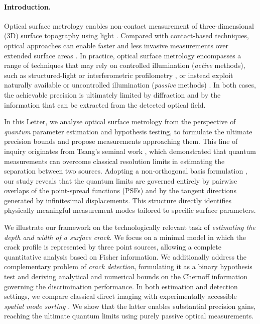 \documentclass[reprint,amsmath,amssymb,aps,prl,floatfix,groupedaddress,superscriptaddress]{revtex4-2}
\begin{document}
\maketitle


\paragraph{\bfseries Introduction.\label{sec:intro}}
Optical surface metrology enables non-contact measurement of three-dimensional (3D) surface topography using light \cite{leach2020advances,catalucci2022optical}. Compared with contact-based techniques, optical approaches can enable faster and less invasive measurements over extended surface areas \cite{hocken2005optical}. In practice, optical surface metrology encompasses a range of techniques that may rely on controlled illumination ({\em active} methods), such as structured-light or interferometric profilometry \cite{yang2022single,van2019deep,wang2021single,li2016single}, or instead exploit naturally available or uncontrolled illumination ({\em passive} methods) \cite{mathia2011recent,marrugo2020state}. In both cases, the achievable precision is ultimately limited by diffraction and by the information that can be extracted from the detected optical field.


In this Letter, we analyse optical surface metrology from the perspective of {\em quantum} parameter estimation and hypothesis testing, to formulate the ultimate precision bounds and propose measurements approaching them. This line of inquiry originates from Tsang's seminal work \cite{tsang2016quantum}, which demonstrated that quantum measurements can overcome classical resolution limits in estimating the separation between two sources.
Adopting a non-orthogonal basis formulation \cite{fiderer2021general,napoli2019towards,genoni2019non}, our study reveals that the quantum limits are governed entirely by pairwise overlaps of the  point-spread functions (PSFs) and by the tangent directions generated by infinitesimal displacements. This structure directly identifies physically meaningful measurement modes tailored to specific surface parameters.


We illustrate our framework on the technologically relevant task of {\em estimating the depth and width of a surface crack}. We focus on a minimal model in which the crack profile is represented by three point sources, allowing a complete quantitative analysis based on Fisher information. We additionally address the complementary problem of {\em crack detection}, formulating it as a binary hypothesis test \cite{GG} and deriving analytical and numerical bounds on the Chernoff information governing the discrimination performance. In both estimation and detection settings, we compare classical direct imaging with experimentally accessible {\em spatial mode sorting} \cite{modes,starlight,da2021super,MPLC,Paur:16,Yang:16,Tham:17,zhou2019quantum,Zanfo,Frank:23,bradypo}. We show that the latter enables substantial precision gains, reaching the ultimate quantum limits using purely passive optical measurements.
\end{document}
